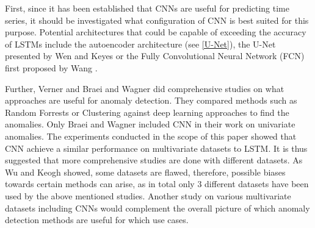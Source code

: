 First, since it has been established that CNNs are useful for predicting time series, it should be investigated what configuration of CNN is best suited for this purpose. Potential architectures that could be capable of exceeding the accuracy of LSTMs include the autoencoder architecture (see \ref{U-Net}), the U-Net presented by Wen and Keyes \parencite*{Wen2019} or the Fully Convolutional Neural Network (FCN) first proposed by Wang \parencite*{Wang2017}.

Further, Verner \parencite*{Verner2019} and Braei and Wagner \parencite*{Braei2020} did comprehensive studies on what approaches are useful for anomaly detection. They compared methods such as Random Forrests or Clustering against deep learning approaches to find the anomalies. Only Braei and Wagner \parencite*{Braei2020} included CNN in their work on univariate anomalies. The experiments conducted in the scope of this paper showed that CNN achieve a similar performance on multivariate datasets to LSTM. It is thus suggested that more comprehensive studies are done with different datasets. As Wu and Keogh \parencite*{Wu2020} showed, some datasets are flawed, therefore, possible biases towards certain methods can arise, as in total only 3 different datasets have been used by the above mentioned studies. Another study on various multivariate datasets including CNNs would complement the overall picture of which anomaly detection methods are useful for which use cases.







